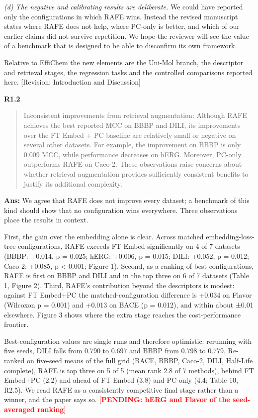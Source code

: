 \documentclass[
  10pt,
]{article}
\newcommand{\placeholder}[1]{\textcolor{red}{\textbf{[PENDING#1]}}}
\begin{document}
\emph{(d) The negative and calibrating results are deliberate.} We could
have reported only the configurations in which RAFE wins. Instead the
revised manuscript states where RAFE does not help, where PC-only is
better, and which of our earlier claims did not survive repetition. We
hope the reviewer will see the value of a benchmark that is designed to
be able to disconfirm its own framework.

Relative to EffiChem the new elements are the Uni-Mol branch, the
descriptor and retrieval stages, the regression tasks and the controlled
comparisons reported here. {[}Revision: Introduction and Discussion{]}

\textbf{R1.2}

\begin{quote}
Inconsistent improvements from retrieval augmentation: Although RAFE
achieves the best reported MCC on BBBP and DILI, its improvements over
the FT Embed + PC baseline are relatively small or negative on several
other datasets. For example, the improvement on BBBP is only 0.009 MCC,
while performance decreases on hERG. Moreover, PC-only outperforms RAFE
on Caco-2. These observations raise concerns about whether retrieval
augmentation provides sufficiently consistent benefits to justify its
additional complexity.
\end{quote}

\textbf{Ans:} We agree that RAFE does not improve every dataset; a
benchmark of this kind should show that no configuration wins
everywhere. Three observations place the results in context.

First, the gain over the embedding alone is clear. Across matched
embedding-loss-tree configurations, RAFE exceeds FT Embed significantly
on 4 of 7 datasets (BBBP: +0.014, p = 0.025; hERG: +0.006, p = 0.015;
DILI: +0.052, p = 0.012; Caco-2: +0.085, p \textless{} 0.001; Figure 1).
Second, as a ranking of best configurations, RAFE is first on BBBP and
DILI and in the top three on 6 of 7 datasets (Table 1, Figure 2). Third,
RAFE's contribution beyond the descriptors is modest: against FT
Embed+PC the matched-configuration difference is +0.034 on Flavor
(Wilcoxon p = 0.001) and +0.013 on BACE (p = 0.012), and within about
±0.01 elsewhere. Figure 3 shows where the extra stage reaches the
cost-performance frontier.

Best-configuration values are single runs and therefore optimistic:
rerunning with five seeds, DILI falls from 0.790 to 0.697 and BBBP from
0.798 to 0.779. Re-ranked on five-seed means of the full grid (BACE,
BBBP, Caco-2, DILI, Half-Life complete), RAFE is top three on 5 of 5
(mean rank 2.8 of 7 methods), behind FT Embed+PC (2.2) and ahead of FT
Embed (3.8) and PC-only (4.4; Table 10, R2.5). We read RAFE as a
consistently competitive final stage rather than a winner, and the paper
says so. \placeholder{: hERG and Flavor of the seed-averaged
ranking}
\end{document}
